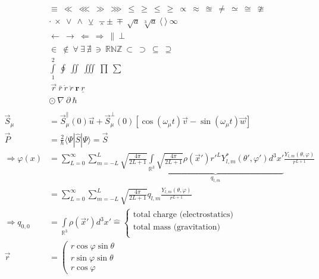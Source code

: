 \documentclass[12pt, a4paper, twopage]{scrartcl}
\newcommand{\entspricht}{\mathrel{\widehat{=}}}
\begin{document}
\begin{align}
	 & \equiv \ \ll \ \lll \ \gg \ \ggg \ \leq \ \geq \ \leqslant \ \geqslant \ \propto \ \approx \ \approxeq \ \neq \ \simeq \ \cong \ \ncong \\\
	 & \cdot \ \times \ \vee \ \wedge \ \veebar \ \barwedge \pm \ \mp \ \sqrt{a} \ \sqrt[3]{a} \ \langle \ \rangle \ \infty\\
	 & \leftarrow \ \rightarrow \ \Leftarrow \ \Rightarrow \ \parallel \ \bot \ \\
	 & \in \ \notin\ \forall \ \exists \ \nexists \ \ni \ \mathbb{RNZ} \ \subset \ \supset \ \subseteq \ \supseteq \ \\
	 & \int\limits_{1}^{2} \ \oint \ \iint \ \iiint \ \prod \ \sum \ \\
	 & \ \vec{r} \ \bar{r} \ \dot{r} \ \ddot{r} \ \mathbf{r} \ \underline{r} \\
	 & \odot \ \nabla \ \partial \ \hbar\\
	 \nonumber \\
	 \vec{S}_\mu &= \vec{S}_\mu ^{\parallel}(0) \vec{u} + \vec{S}_\mu^{\bot} (0) [\cos(\omega_\mu t)\vec{v} - \sin(\omega_\mu t)\vec{w}]\\
	 \vec{P} &= \frac{2}{\hbar} \langle \Psi | \hat{S} | \Psi \rangle = \vec{S}\\
	 \Rightarrow \varphi (x) &= \sum\limits_{L = 0}^{\infty} \sum\limits_{m = - L}^{L} \sqrt{\frac{4 \pi}{2 L + 1}}  \underbrace{\int\limits_{\mathbb{R}^3} \sqrt{\frac{4 \pi}{2 L + 1}} \rho(\vec{x} ' ) r'^{L} Y_{l, m}^{*} (\theta ', \varphi ') d^3 x'}_{q_{l,m}}  \frac{Y_{l,m}(\theta, \varphi)}{r^ {L + 1}} \\ 
	 &= \sum\limits_{L = 0}^{\infty} \sum\limits_{m = - L}^{L} \sqrt{\frac{4 \pi}{2 L + 1}} q_{l,m}  \frac{Y_{l,m}(\theta, \varphi)}{r^ {L + 1}}\\
	 \nonumber
	 \Rightarrow q_{0, 0} &= \int \limits_{\mathbb{R}^3} \rho(\vec{x}' ) d^3 x' \entspricht 
	 \begin{cases} 
	 \text{total charge (electrostatics)} \\
	 \text{total mass (gravitation)}\\
	 \end{cases}\\
	 \vec{r} &= \left( \begin{matrix}
	 r \cos \varphi \sin \theta\\
	 r \sin \varphi \sin \theta\\
	 r \cos \varphi

\end{matrix}
\end{align}
\end{document}
